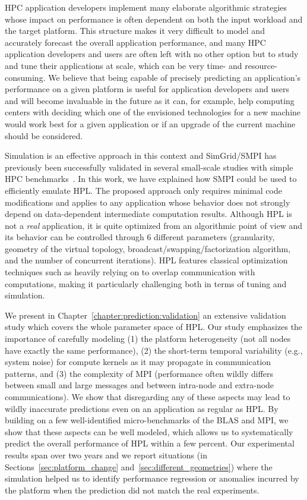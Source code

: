     HPC application developers implement many elaborate algorithmic strategies whose impact on performance is often
    dependent on both the input workload and the target platform. This structure makes it very difficult to model and
    accurately forecast the overall application performance, and many HPC application developers and users are often
    left with no other option but to study and tune their applications at scale, which can be very time- and
    resource-consuming. We believe that being capable of precisely predicting an application's performance on a given
    platform is useful for application developers and users and will become invaluable in the future as it can, for
    example, help computing centers with deciding which one of the envisioned technologies for a new machine would work
    best for a given application or if an upgrade of the current machine should be considered.

    Simulation is an effective approach in this context and SimGrid/SMPI has previously been successfully validated in
    several small-scale studies with simple HPC benchmarks~\cite{smpi,heinrich:hal-01523608}. In this work, we have
    explained how SMPI could be used to efficiently emulate HPL. The proposed approach only requires minimal code
    modifications and applies to any application whose behavior does not strongly depend on data-dependent intermediate
    computation results.  Although HPL is not a \emph{real} application, it is quite optimized from an algorithmic point
    of view and its behavior can be controlled through 6 different parameters (granularity, geometry of the virtual
    topology, broadcast/swapping/factorization algorithm, and the number of concurrent iterations). HPL features
    classical optimization techniques such as heavily relying on \iprobe to overlap communication with
    computations, making it particularly challenging both in terms of tuning and simulation.

    We present in Chapter~\ref{chapter:prediction:validation} an extensive validation study which covers the whole
    parameter space of HPL. Our study emphasizes the importance of carefully modeling (1) the platform heterogeneity
    (not all nodes have exactly the same performance), (2) the short-term temporal variability (e.g., system noise) for
    compute kernels as it may propagate in communication patterns, and (3) the complexity of MPI (performance often
    wildly differs between small and large messages and between intra-node and extra-node communications). We show that
    disregarding any of these aspects may lead to wildly inaccurate predictions even on an application as regular as
    HPL. By building on a few well-identified micro-benchmarks of the BLAS and MPI, we show that these aspects can be
    well modeled, which allows us to systematically predict the overall performance of HPL within a few percent. Our
    experimental results span over two years and we report situations (in Sections~\ref{sec:platform_change}
    and~\ref{sec:different_geometries}) where the simulation helped us to identify performance regression or anomalies
    incurred by the platform when the prediction did not match the real experiments.

